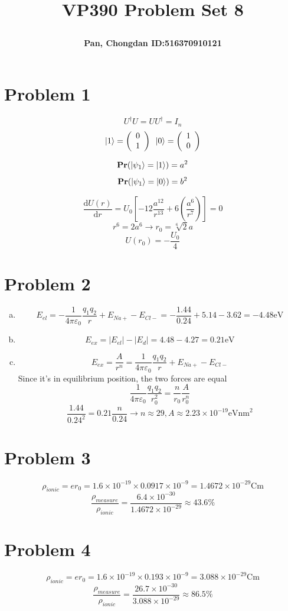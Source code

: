 \documentclass[a4paper]{article}
\title{\Large \textbf{VP390 Problem Set 8}\\
\author{\textbf{Pan, Chongdan ID:516370910121}\\
}
}
\begin{document}
\maketitle
\section{Problem 1}
\noindent
$$U^\dagger U=UU^\dagger=I_n$$
$$\ket{1}=\left(\begin{array}{c}
    0\\1
\end{array}\right)\text{    }\ket{0}=\left(\begin{array}{c}
    1\\0
\end{array}\right)$$

$$\textbf{Pr}(\ket{\psi_1}=\ket{1})=a^2$$
$$\textbf{Pr}(\ket{\psi_1}=\ket{0})=b^2$$


$$\frac{\mathrm{d}U(r)}{\mathrm{d}r}=U_0[-12\frac{a^{12}}{r^{13}}+6(\frac{a^6}{r^7})]=0$$
$$r^6=2a^6\rightarrow r_0=\sqrt[6]{2}a$$
$$U(r_0)=-\frac{U_0}{4}$$
\section{Problem 2}
\begin{enumerate}[(a)]
    \item $$E_{el}=-\frac{1}{4\pi\varepsilon_0}\frac{q_1q_2}{r}+E_{Na+}-E_{Cl-}=-\frac{1.44}{0.24}+5.14-3.62=-4.48\text{eV}$$
    \item $$E_{ex}=|E_{el}|-|E_d|=4.48-4.27=0.21\text{eV}$$
    \item $$E_{ex}=\frac{A}{r^n}=\frac{1}{4\pi\varepsilon_0}\frac{q_1q_2}{r}+E_{Na+}-E_{Cl-}$$
    Since it's in equilibrium position, the two forces are equal
    $$\frac{1}{4\pi\varepsilon_0}\frac{q_1q_2}{r_0^2}=\frac{n}{r_0}\frac{A}{r_0^n}$$
    $$\frac{1.44}{0.24^2}=0.21\frac{n}{0.24}\rightarrow n\approx29,A\approx2.23\times10^{-19}\text{eVnm}^2$$
\end{enumerate}
\section{Problem 3}
$$\rho_{ionic}=er_0=1.6\times10^{-19}\times0.0917\times10^{-9}=1.4672\times10^{-29}\text{Cm}$$
$$\frac{\rho_{measure}}{\rho_{ionic}}=\frac{6.4\times10^{-30}}{1.4672\times10^{-29}}\approx43.6\%$$
\section{Problem 4}
$$\rho_{ionic}=er_0=1.6\times10^{-19}\times0.193\times10^{-9}=3.088\times10^{-29}\text{Cm}$$
$$\frac{\rho_{measure}}{\rho_{ionic}}=\frac{26.7\times10^{-30}}{3.088\times10^{-29}}\approx86.5\%$$
\end{document}
